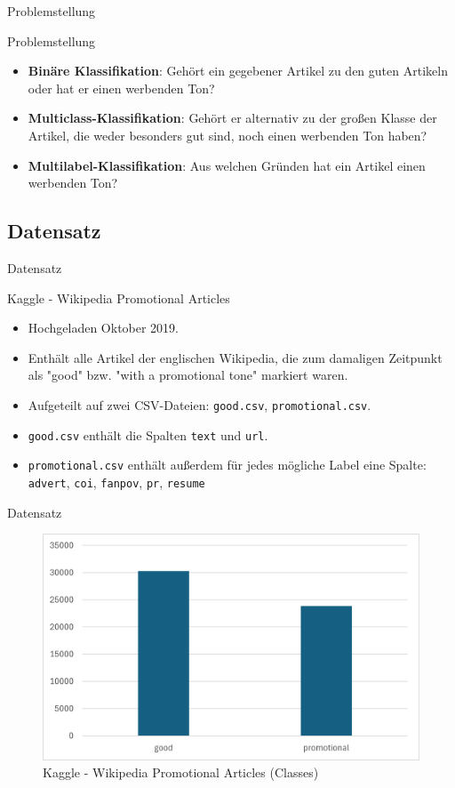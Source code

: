 \documentclass[aspectratio=169]{beamer} %
\begin{document}
\begin{frame}{Problemstellung}
    \begin{block}{Problemstellung}
        \begin{itemize}
            \item \textbf{Binäre Klassifikation}: Gehört ein gegebener Artikel zu den guten Artikeln oder hat er einen werbenden Ton?
            \item \textbf{Multiclass-Klassifikation}: Gehört er alternativ zu der großen Klasse der Artikel, die weder besonders gut sind, noch einen werbenden Ton haben?
            \item \textbf{Multilabel-Klassifikation}: Aus welchen Gründen hat ein Artikel einen werbenden Ton?
        \end{itemize}
    \end{block}
\end{frame}

\subsection{Datensatz}

\begin{frame}{Datensatz}
    \begin{block}{Kaggle - Wikipedia Promotional Articles}
        \begin{itemize}
            \item Hochgeladen Oktober 2019.
            \item Enthält alle Artikel der englischen Wikipedia, die zum damaligen Zeitpunkt als "good" bzw. "with a promotional tone" markiert waren.
            \item Aufgeteilt auf zwei CSV-Dateien: \texttt{good.csv}, \texttt{promotional.csv}.
            \item \texttt{good.csv} enthält die Spalten \texttt{text} und \texttt{url}.
            \item \texttt{promotional.csv} enthält außerdem für jedes mögliche Label eine Spalte: \texttt{advert}, \texttt{coi}, \texttt{fanpov}, \texttt{pr}, \texttt{resume}
        \end{itemize}
    \end{block}
\end{frame}

\begin{frame}{Datensatz}
    \begin{figure}
        \centering
        \includegraphics[width=0.6\linewidth]{figures/kaggle-classes.png}
        \caption{Kaggle - Wikipedia Promotional Articles (Classes)}
    \end{figure}
\end{frame}
\end{document}

